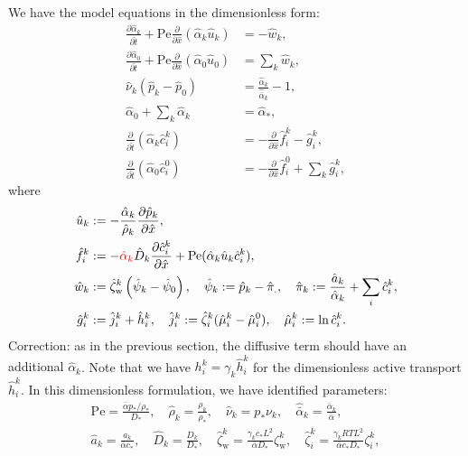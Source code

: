 \documentclass{article}
\begin{document}
We have the model equations in the dimensionless form:
\begin{align}
    \frac{\partial \hat{\alpha}_k}{\partial \hat{t}}  + \mathrm{Pe}\frac{\partial}{\partial \hat{x}}\left( \hat{\alpha}_k \hat{u}_k \right) &= - \hat{w}_k,\\ \label{eq:nd_1steq}
    \frac{\partial\hat{\alpha}_0}{\partial \hat{t}}+\mathrm{Pe}\frac{\partial}{\partial \hat{x}}\left( \hat{\alpha}_0 \hat{u}_0 \right) &=\sum_k \hat{w}_k,\\
    \hat{\nu}_k\left( \hat{p}_k - \hat{p}_0 \right) &= \frac{\hat{\alpha}_k}{\hat{\bar{\alpha}}_k}-1,\\
    \hat{\alpha}_0 + \sum_{k} \hat{\alpha}_k &= \hat{\alpha}_*,\\
    \frac{\partial}{\partial \hat{t}}\left( \hat{\alpha}_k \hat{c}_i^k \right)&=-\frac{\partial}{\partial \hat{x}} \hat{f}_i^k - \hat{g}_i^k,\\
    \frac{\partial}{\partial \hat{t}}\left( \hat{\alpha}_0 \hat{c}_i^0 \right)&=-\frac{\partial}{\partial \hat{x}} \hat{f}_i^0 + \sum_k \hat{g}_i^k,
\end{align}
    where
\begin{align}
    \hat{u}_k &:= -\frac{\hat{\alpha}_k}{\hat{\rho}_k}\frac{\partial \hat{p}_k}{\partial \hat{x}},\\
    \hat{f}_i^k &:= -{\color{red}\hat{\alpha}_k}\hat{D}_k \frac{\partial \hat{c}_i^k}{\partial \hat{x}} + \mathrm{Pe}(\hat{\alpha}_k\hat{u}_k\hat{c}_i^k),\\
    \hat{w}_k&:= \hat{\zeta}_\mathrm{w}^k\left( \hat{\psi}_k-\hat{\psi}_0 \right),\quad\hat{\psi}_k := \hat{p}_k - \hat{\pi}_.,\quad \hat{\pi}_k := \frac{\hat{a}_k}{\hat{\alpha}_k}+\sum_i \hat{c}_i^k,\\
    \hat{g}_i^k &:= \hat{j}_i^k+\hat{h}_i^k,\quad \hat{j}_i^k :=\hat{\zeta}_i^k(\hat{\mu}_i^k-\hat{\mu}_i^0),\quad \hat{\mu}_i^k:=\ln \hat{c}_i^k.\label{eq:nd_lasteq}
\end{align}
{\color{red}Correction: as in the previous section, the diffusive term should have an additional $\hat{\alpha}_k$}.
Note that we have $h_i^k = \gamma_k\hat{h}_i^k$ for the dimensionless active transport $\hat{h}_i^k$.
In this dimensionless formulation, we have identified parameters:
\begin{gather}
    \mathrm{Pe} = \frac{\bar{\alpha}p_*/\rho_*}{D_*},\quad \hat{\rho}_k = \frac{\rho_k}{\rho_*},\quad \hat{\nu}_k = p_*\nu_k,\quad \hat{\bar{\alpha}}_k = \frac{\bar{\alpha}_k}{\bar{\alpha}},\\
    \hat{a}_k = \frac{a_k}{\bar{\alpha}c_*},\quad
    \hat{D}_k = \frac{D_k}{D_*},\quad \hat{\zeta}_\mathrm{w}^k = \frac{\gamma_k c_*L^2}{\bar{\alpha}D_*}\zeta_\mathrm{w}^k,\quad\hat{\zeta}_i^k = \frac{\gamma_kRT L^2}{\bar{\alpha}c_* D_*}\zeta_i^k,
\end{gather}
\end{document}

